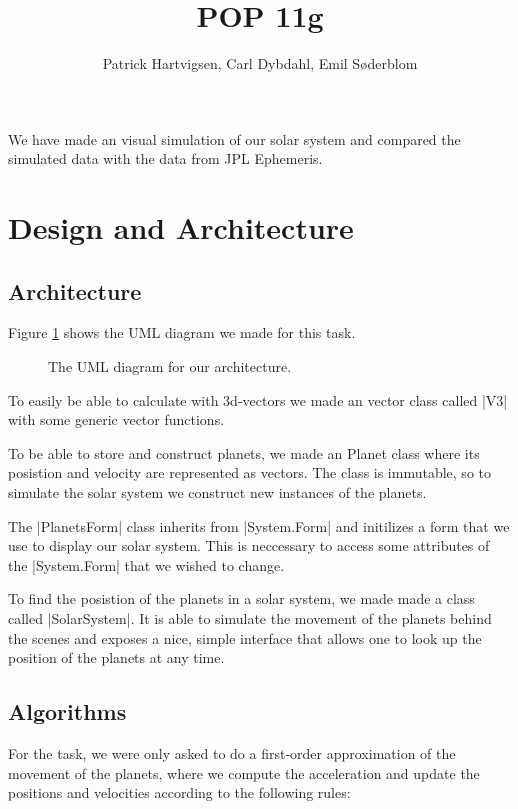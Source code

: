 \documentclass[a4paper]{article}
\title{POP 11g}
\author{Patrick Hartvigsen, Carl Dybdahl, Emil Søderblom}
\begin{document}
\maketitle

We have made an visual simulation of our solar system and compared the simulated data with the data from JPL Ephemeris.

\section{Design and Architecture}

\subsection{Architecture}

Figure \ref{uml} shows the UML diagram we made for this task. 

\begin{figure}[!ht]
\centering
\caption{The UML diagram for our architecture.}
\label{uml}
\end{figure}

To easily be able to calculate with 3d-vectors we made an vector class called \code|V3| with some generic vector functions.

To be able to store and construct planets, we made an Planet class where its posistion and velocity are represented as vectors. The class is immutable, so to simulate the solar system we construct new instances of the planets.

The \code|PlanetsForm| class inherits from \code|System.Form| and initilizes a form that we use to display our solar system. This is neccessary to access some attributes of the \code|System.Form| that we wished to change.

To find the posistion of the planets in a solar system, we made made a class called \code|SolarSystem|. It is able to simulate the movement of the planets behind the scenes and exposes a nice, simple interface that allows one to look up the position of the planets at any time.

\subsection{Algorithms}

For the task, we were only asked to do a first-order approximation of the movement of the planets, where we compute the acceleration and update the positions and velocities according to the following rules:
\end{document}
